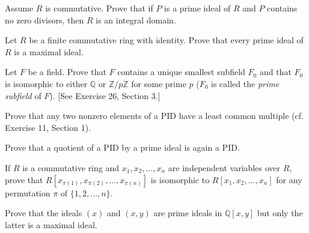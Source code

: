 \documentclass[12pt,letterpaper]{hmcpset}
\newcommand{\Zz}{\mathbb{Z}}
\newcommand{\Qq}{\mathbb{Q}}
\begin{document}

\begin{problem}[7.4.10]
	Assume $R$ is commutative. Prove that if $P$ is a prime ideal of $R$ and $P$ contains no zero divisors, then $R$ is an integral domain.
\end{problem}

\begin{solution}
\vfill
\end{solution}
\newpage

\begin{problem}[7.4.19]
	Let $R$ be a finite commutative ring with identity. Prove that every prime ideal of $R$ is a maximal ideal.
\end{problem}

\begin{solution}
\vfill
\end{solution}
\newpage

\begin{problem}
	Let $F$ be a field. Prove that $F$ contains a unique smallest subfield $F_0$ and that $F_0$ is isomorphic to either $\Qq$ or $\Zz/p\Zz$ for some prime $p$ ($F_0$ is called the \emph{prime subfield} of $F$). [See Exercise 26, Section 3.]
\end{problem}

\begin{problem}[8.2.2]
  Prove that any two nonzero elements of a PID have a least common multiple (cf. Exercise 11, Section 1).
\end{problem}
\begin{solution}
\vfill
\end{solution}
\newpage

\begin{problem}[8.2.3]
	Prove that a quotient of a PID by a prime ideal is again a PID.
\end{problem}
\begin{solution}
	\vfill
\end{solution}
\newpage

\begin{problem}[9.1.3]
	If $R$ is a commutative ring and $x_1, x_2, \dots, x_n$ are independent variables over $R$, prove that $R[x_{\pi(1)}, x_{\pi(2)}, \dots, x_{\pi(n)}]$ is isomorphic to $R[x_1,x_2,\dots,x_n]$ for any permutation $\pi$ of $\{1,2,\dots,n\}.$
\end{problem}
\begin{solution}
	\vfill
\end{solution}
\newpage

\begin{problem}[9.1.4]
  Prove that the ideals $(x)$ and $(x,y)$ are prime ideals in $\Qq[x,y]$ but only the latter is a maximal ideal.
\end{problem}
\begin{solution}
	\vfill
\end{solution}
\end{document}

